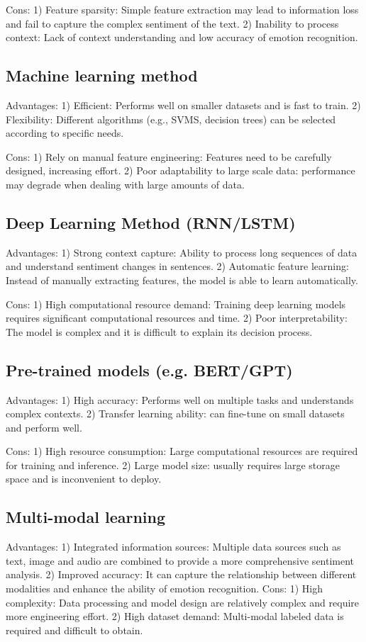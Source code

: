\documentclass[journal]{IEEEtran}
\begin{document}
Cons:
1)	Feature sparsity: Simple feature extraction may lead to information loss and fail to capture the complex sentiment of the text.
2)	Inability to process context: Lack of context understanding and low accuracy of emotion recognition.
\subsection{Machine learning method}
Advantages:
1)	Efficient: Performs well on smaller datasets and is fast to train.
2)	Flexibility: Different algorithms (e.g., SVMS, decision trees) can be selected according to specific needs.

Cons:
1)	Rely on manual feature engineering: Features need to be carefully designed, increasing effort.
2)	Poor adaptability to large scale data: performance may degrade when dealing with large amounts of data.
\subsection{Deep Learning Method (RNN/LSTM)}
Advantages:
1)	Strong context capture: Ability to process long sequences of data and understand sentiment changes in sentences.
2)	Automatic feature learning: Instead of manually extracting features, the model is able to learn automatically.

Cons:
1)	High computational resource demand: Training deep learning models requires significant computational resources and time.
2)	Poor interpretability: The model is complex and it is difficult to explain its decision process.
\subsection{Pre-trained models (e.g. BERT/GPT)}
Advantages:
1)	High accuracy: Performs well on multiple tasks and understands complex contexts.
2)	Transfer learning ability: can fine-tune on small datasets and perform well.

Cons:
1)	High resource consumption: Large computational resources are required for training and inference.
2)	Large model size: usually requires large storage space and is inconvenient to deploy.
\subsection{Multi-modal learning}
Advantages:
1)	Integrated information sources: Multiple data sources such as text, image and audio are combined to provide a more comprehensive sentiment analysis.
2)	Improved accuracy: It can capture the relationship between different modalities and enhance the ability of emotion recognition.
Cons:
1)	High complexity: Data processing and model design are relatively complex and require more engineering effort.
2)	High dataset demand: Multi-modal labeled data is required and difficult to obtain.
\end{document}
